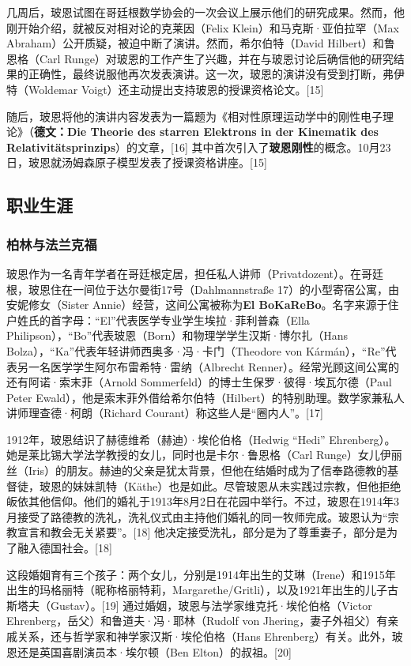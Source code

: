 几周后，玻恩试图在哥廷根数学协会的一次会议上展示他们的研究成果。然而，他刚开始介绍，就被反对相对论的克莱因（Felix Klein）和马克斯·亚伯拉罕（Max Abraham）公开质疑，被迫中断了演讲。然而，希尔伯特（David Hilbert）和鲁恩格（Carl Runge）对玻恩的工作产生了兴趣，并在与玻恩讨论后确信他的研究结果的正确性，最终说服他再次发表演讲。这一次，玻恩的演讲没有受到打断，弗伊特（Woldemar Voigt）还主动提出支持玻恩的授课资格论文。[15] 

随后，玻恩将他的演讲内容发表为一篇题为《相对性原理运动学中的刚性电子理论》（\textbf{德文：Die Theorie des starren Elektrons in der Kinematik des Relativitätsprinzips}）的文章，[16] 其中首次引入了\textbf{玻恩刚性}的概念。10月23日，玻恩就汤姆森原子模型发表了授课资格讲座。[15]
\subsection{职业生涯}  
\subsubsection{柏林与法兰克福}  
玻恩作为一名青年学者在哥廷根定居，担任私人讲师（Privatdozent）。在哥廷根，玻恩住在一间位于达尔曼街17号（Dahlmannstraße 17）的小型寄宿公寓，由安妮修女（Sister Annie）经营，这间公寓被称为\textbf{El BoKaReBo}。名字来源于住户姓氏的首字母：“El”代表医学专业学生埃拉·菲利普森（Ella Philipson），“Bo”代表玻恩（Born）和物理学学生汉斯·博尔扎（Hans Bolza），“Ka”代表年轻讲师西奥多·冯·卡门（Theodore von Kármán），“Re”代表另一名医学学生阿尔布雷希特·雷纳（Albrecht Renner）。经常光顾这间公寓的还有阿诺·索末菲（Arnold Sommerfeld）的博士生保罗·彼得·埃瓦尔德（Paul Peter Ewald），他是索末菲外借给希尔伯特（Hilbert）的特别助理。数学家兼私人讲师理查德·柯朗（Richard Courant）称这些人是“圈内人”。[17]  

1912年，玻恩结识了赫德维希（赫迪）·埃伦伯格（Hedwig “Hedi” Ehrenberg）。她是莱比锡大学法学教授的女儿，同时也是卡尔·鲁恩格（Carl Runge）女儿伊丽丝（Iris）的朋友。赫迪的父亲是犹太背景，但他在结婚时成为了信奉路德教的基督徒，玻恩的妹妹凯特（Käthe）也是如此。尽管玻恩从未实践过宗教，但他拒绝皈依其他信仰。他们的婚礼于1913年8月2日在花园中举行。不过，玻恩在1914年3月接受了路德教的洗礼，洗礼仪式由主持他们婚礼的同一牧师完成。玻恩认为“宗教宣言和教会无关紧要”。[18] 他决定接受洗礼，部分是为了尊重妻子，部分是为了融入德国社会。[18]  

这段婚姻育有三个孩子：两个女儿，分别是1914年出生的艾琳（Irene）和1915年出生的玛格丽特（昵称格丽特莉，Margarethe/Gritli），以及1921年出生的儿子古斯塔夫（Gustav）。[19] 通过婚姻，玻恩与法学家维克托·埃伦伯格（Victor Ehrenberg，岳父）和鲁道夫·冯·耶林（Rudolf von Jhering，妻子外祖父）有亲戚关系，还与哲学家和神学家汉斯·埃伦伯格（Hans Ehrenberg）有关。此外，玻恩还是英国喜剧演员本·埃尔顿（Ben Elton）的叔祖。[20]

